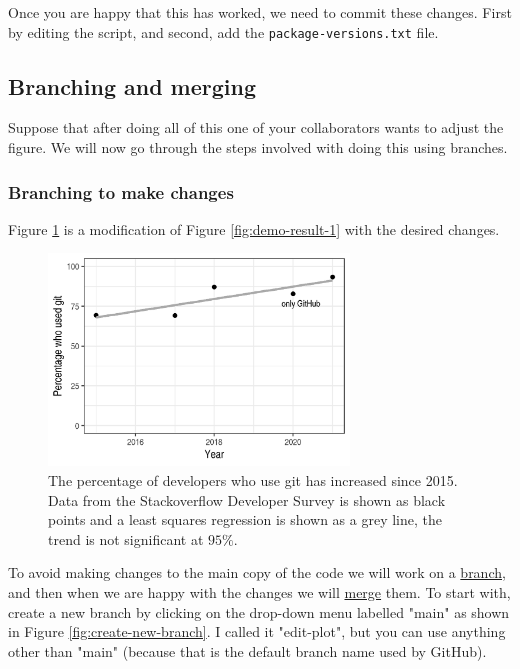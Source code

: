 \documentclass[11pt,onecolumn]{scrartcl}
\begin{document}
Once you are happy that this has worked, we need to commit these changes. First
by editing the script, and second, add the \texttt{package-versions.txt} file.

\subsection{Branching and merging}
\label{sec:org654329d}

Suppose that after doing all of this one of your collaborators wants to adjust
the figure. We will now go through the steps involved with doing this using
branches.

\subsubsection*{Branching to make changes}
\label{sec:org977d949}

Figure \ref{fig:demo-result-2} is a modification of Figure \ref{fig:demo-result-1} with the
desired changes.

\begin{figure}[htbp]
\centering
\includegraphics[width=8cm]{./git-usage-2.png}
\caption{\label{fig:demo-result-2}The percentage of developers who use git has increased since 2015. Data from the Stackoverflow Developer Survey is shown as black points and a least squares regression is shown as a grey line, the trend is not significant at \(95\%\).}
\end{figure}

To avoid making changes to the main copy of the code we will work on a \hyperref[sec:orgb816f44]{branch},
and then when we are happy with the changes we will \hyperref[sec:orgce0d2b8]{merge} them. To start with,
create a new branch by clicking on the drop-down menu labelled "main" as shown
in Figure \ref{fig:create-new-branch}. I called it "edit-plot", but you can use
anything other than "main" (because that is the default branch name used by
GitHub).
\end{document}
